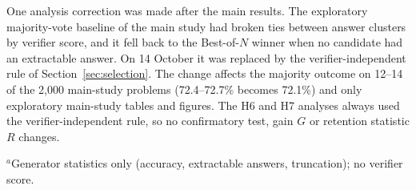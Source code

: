 One analysis correction was made after the main results. The exploratory majority-vote
baseline of the main study had broken ties between answer clusters by verifier score,
and it fell back to the Best-of-$N$ winner when no candidate had an extractable answer.
On 14 October it was replaced by the verifier-independent rule
of Section~\ref{sec:selection}. The change affects the majority outcome on 12--14 of the
2,000 main-study problems (72.4--72.7\% becomes 72.1\%) and only exploratory main-study
tables and figures. The H6 and H7 analyses always used the verifier-independent rule, so
no confirmatory test, gain $G$ or retention statistic $R$ changes.

\begin{table}[!htb]
\centering
\scriptsize
\caption{Chronology of plans and data (commit timestamps, 2026).}\label{tab:chronology}

\smallskip
\raggedright\scriptsize $^{a}$Generator statistics only (accuracy, extractable answers, truncation); no verifier score.
\end{table}
